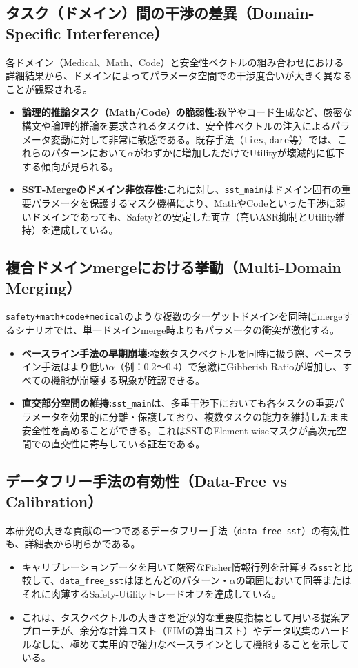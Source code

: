 \subsection{タスク（ドメイン）間の干渉の差異（Domain-Specific Interference）}
各ドメイン（Medical、Math、Code）と安全性ベクトルの組み合わせにおける詳細結果から、ドメインによってパラメータ空間での干渉度合いが大きく異なることが観察される。
\begin{itemize}
    \item \textbf{論理的推論タスク（Math/Code）の脆弱性:}数学やコード生成など、厳密な構文や論理的推論を要求されるタスクは、安全性ベクトルの注入によるパラメータ変動に対して非常に敏感である。既存手法（\texttt{ties}, \texttt{dare}等）では、これらのパターンにおいて$\alpha$がわずかに増加しただけでUtilityが壊滅的に低下する傾向が見られる。
    \item \textbf{SST-Mergeのドメイン非依存性:}これに対し、\texttt{sst\_main}はドメイン固有の重要パラメータを保護するマスク機構により、MathやCodeといった干渉に弱いドメインであっても、Safetyとの安定した両立（高いASR抑制とUtility維持）を達成している。
\end{itemize}

\subsection{複合ドメインmergeにおける挙動（Multi-Domain Merging）}
\texttt{safety+math+code+medical}のような複数のターゲットドメインを同時にmergeするシナリオでは、単一ドメインmerge時よりもパラメータの衝突が激化する。
\begin{itemize}
    \item \textbf{ベースライン手法の早期崩壊:}複数タスクベクトルを同時に扱う際、ベースライン手法はより低い$\alpha$（例：0.2〜0.4）で急激にGibberish Ratioが増加し、すべての機能が崩壊する現象が確認できる。
    \item \textbf{直交部分空間の維持:}\texttt{sst\_main}は、多重干渉下においても各タスクの重要パラメータを効果的に分離・保護しており、複数タスクの能力を維持したまま安全性を高めることができる。これはSSTのElement-wiseマスクが高次元空間での直交性に寄与している証左である。
\end{itemize}

\subsection{データフリー手法の有効性（Data-Free vs Calibration）}
本研究の大きな貢献の一つであるデータフリー手法（\texttt{data\_free\_sst}）の有効性も、詳細表から明らかである。
\begin{itemize}
    \item キャリブレーションデータを用いて厳密なFisher情報行列を計算する\texttt{sst}と比較して、\texttt{data\_free\_sst}はほとんどのパターン・$\alpha$の範囲において同等またはそれに肉薄するSafety-Utilityトレードオフを達成している。
    \item これは、タスクベクトルの大きさを近似的な重要度指標として用いる提案アプローチが、余分な計算コスト（FIMの算出コスト）やデータ収集のハードルなしに、極めて実用的で強力なベースラインとして機能することを示している。
\end{itemize}

